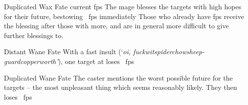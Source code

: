 \ifodd\value{diceNo}

  {Duplicated}%
  {Wax}%
  {Fate}%
  {current \glspl{fp}}%
  {The mage blesses the targets with high hopes for their future, bestowing \showDam~\glspl{fp} immediately}%
  {Those who already have \glspl{fp} receive the blessing after those with more, and are in general more difficult to give further blessings to.}

  {Distant}%
  {Wane}%
  {Fate}%
  {}%
  {With a fast insult (`\textit{oi, \ifcase\value{r4}fuckwit\or spiderchow\or sheep-guard\else copperworth\fi'}), one target at \spellRange{} loses \showDam~\glspl{fp}}%
  {}

\else

  {Duplicated}%
  {Wane}%
  {Fate}%
  {}%
  {The caster mentions the worst possible future for the targets -- the most unpleasant thing which seems reasonably likely.
    They then loses \showDam~\glspl{fp}}%
  {}

\fi
{}
